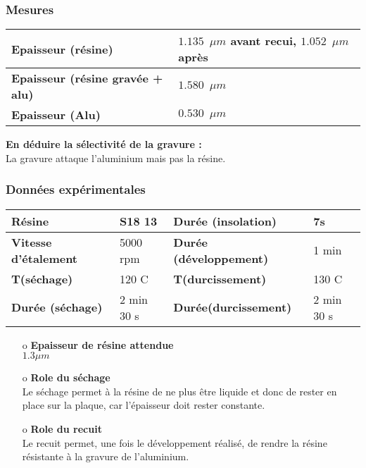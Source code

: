 \documentclass[11pt]{article}
\begin{document}
\subsubsection{Mesures}

    \noindent \begin{tabular}[!htb]{ | p{7cm} | p{7cm} | }
    \hline
    \textbf{Epaisseur (r\'esine)} & $1.135 \phantom{2}\mu m$ avant recui, $1.052 \phantom{2} \mu m$ apr\`es \\ \hline
    \textbf{Epaisseur (r\'esine grav\'ee + alu)} &  $1.580 \phantom{2} \mu m$\\ \hline
    \textbf{Epaisseur (Alu)} & $0.530 \phantom{2} \mu m$\\
    \hline
    \end{tabular}


\textbf{En d\'eduire la s\'electivit\'e de la gravure :} \\
La gravure attaque l'aluminium mais pas la r\'esine.

\subsubsection{Donn\'ees exp\'erimentales}

    \noindent \begin{tabular}[!htb]{ | p{3.5cm} | p{3.5cm} | p{4cm} | p{3.5cm} | }
    \hline
    \textbf{R\'esine} & S18 13 & \textbf{Dur\'ee (insolation)}  & 7s\\ \hline
    \textbf{Vitesse d'\'etalement} & 5000 rpm & \textbf{Dur\'ee (d\'eveloppement)} & 1 min\\ \hline
    \textbf{T(s\'echage)} & 120 C & \textbf{T(durcissement)} & 130 C\\ \hline
    \textbf{Dur\'ee (s\'echage)} & 2 min 30 s & \textbf{Dur\'ee(durcissement)} & 2 min 30 s \\
    \hline
    \end{tabular}

\begin{itemize}
\item[o] \textbf{Epaisseur de r\'esine attendue} \\
$1.3 \mu m$
\item[o] \textbf{Role du s\'echage}\\
Le s\'echage permet \`a la r\'esine de ne plus \^etre liquide et donc de rester en place sur la plaque, car l'\'epaisseur doit rester constante.
\item[o] \textbf{Role du recuit}\\
Le recuit permet, une fois le d\'eveloppement r\'ealis\'e, de rendre la r\'esine r\'esistante \`a la gravure de l'aluminium.

\end{itemize}
\end{document}
